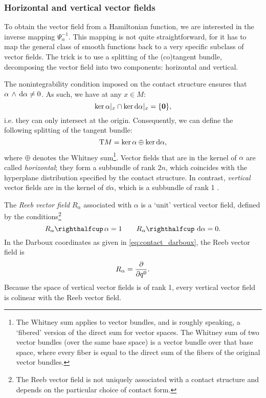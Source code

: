 \subsubsection{Horizontal and vertical vector fields} 
To obtain the vector field from a Hamiltonian function, we are interested in the inverse mapping \(\Psi^{-1}_\alpha\). This mapping is not quite straightforward, for it has to map the general class of smooth functions back to a very specific subclass of vector fields. The trick is to use a splitting of the (co)tangent bundle, decomposing the vector field into two components: horizontal and vertical. 

The nonintegrability condition imposed on the contact structure ensures that \( \alpha\,\wedge\,\dd{\alpha}  \neq 0\). As such, we have at any \(x\in M\):
\begin{equation}
     \ker{\alpha}\vert_x \cap \ker{\dd{\alpha}}\vert_x = \qty{\mathbf{0}},
\end{equation}
i.e. they can only intersect at the origin. Consequently, we can define the following splitting of the tangent bundle:
\begin{equation}
     \mathrm{T}M = \ker{\alpha}\oplus\ker{\dd{\alpha}},
\end{equation}
where \(\oplus\) denotes the Whitney sum\footnote{The Whitney sum applies to vector bundles, and is roughly speaking, a `fibered' version of the direct sum for vector spaces. The Whitney sum of two vector bundles (over the same base space) is a vector bundle over that base space, where every fiber is equal to the direct sum of the fibers of the original vector bundles.}. Vector fields that are in the kernel of \(\alpha\) are called \emph{horizontal}; they form a subbundle of rank \(2n\), which coincides with the hyperplane distribution specified by the contact structure. In contrast, \emph{vertical} vector fields are in the kernel of \(\dd{\alpha}\), which is a subbundle of rank 1 \cite{Libermann1987}.

The \emph{Reeb vector field} \(R_\alpha\) associated with \(\alpha\) is a `unit' vertical vector field, defined by the conditions\footnote{The Reeb vector field is not uniquely associated with a contact structure and depends on the particular choice of contact form.}
    \begin{equation}
     \intpr{R_\alpha}{\alpha} = 1 \qquad \intpr{R_\alpha}{\dd{\alpha}} = 0.
\end{equation}
In the Darboux coordinates as given in \cref{eq:contact_darboux}, the Reeb vector field is
    \begin{equation}
     R_\alpha = \pdv{}{q^0}.
\end{equation} 
Because the space of vertical vector fields is of rank 1, every vertical vector field is colinear with the Reeb vector field.

